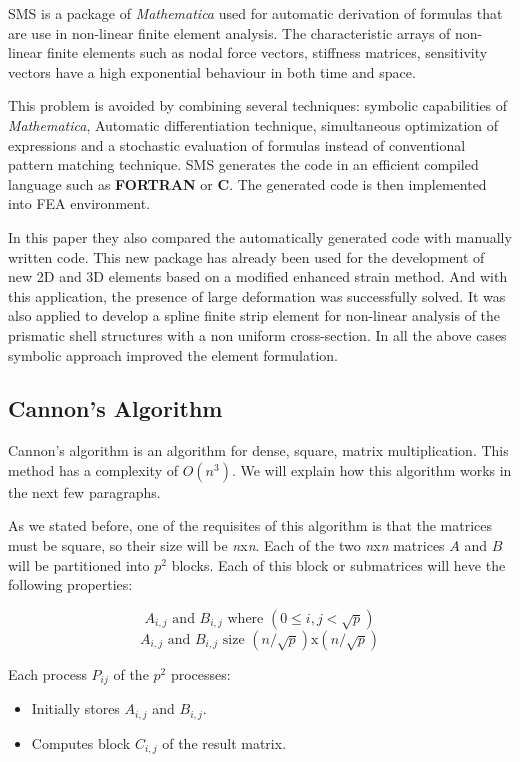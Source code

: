 \documentclass{article}
\begin{document}
SMS is a package of \textit{Mathematica} used for automatic derivation of formulas that are use in non-linear finite element analysis. The characteristic arrays of non-linear finite elements such as nodal force vectors, stiffness matrices, sensitivity vectors have a high exponential behaviour in both time and space.

This problem is avoided by combining several techniques: symbolic capabilities of \textit{Mathematica}, Automatic differentiation technique, simultaneous optimization of expressions and a stochastic evaluation of formulas instead of conventional pattern matching technique. SMS generates the code in an efficient compiled language such as \textbf{FORTRAN} or \textbf{C}. The generated code is then implemented into FEA environment.

In this paper they also compared the automatically generated code with manually written code. This new package has already been used for the development of new 2D and 3D elements based on a modified enhanced strain method. And with this application, the presence of large deformation was successfully solved. It was also applied to develop a spline finite strip element for non-linear analysis of the prismatic shell structures with a non uniform cross-section. In all the above cases symbolic approach improved the element formulation.

\subsection*{Cannon's Algorithm}
Cannon's algorithm is an algorithm for dense, square, matrix multiplication. This method has a complexity of $O(n^3)$. We will explain how this algorithm works in the next few paragraphs.

As we stated before, one of the requisites of this algorithm is that the matrices must be square, so their size will be \textit{n}x\textit{n}. Each of the two \textit{n}x\textit{n} matrices $A$ and $B$ will be partitioned into $p^{2}$ blocks. Each of this block or submatrices will heve the following properties:

$$A_{i,j} \text{ and } B_{i,j} \text{ where } (0\leq i,j < \sqrt{p})$$
$$A_{i,j} \text{ and } B_{i,j} \text{ size } (n/\sqrt{p})\text{x}(n/\sqrt{p})$$

Each process $P_{ij}$ of the $p^{2}$ processes:

\begin{itemize}
 \item Initially stores $A_{i,j}$ and $B_{i,j}$.
 \item Computes block $C_{i,j}$ of the result matrix.
\end{itemize}
\end{document}
